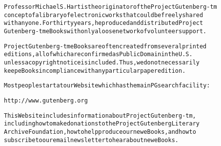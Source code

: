 \documentclass[12pt,oneside]{book}[2007/10/19]
\newenvironment{PGtext}{%
  \begin{alltt}
  \fontsize{9}{10}\ttfamily\selectfont}%
  {\end{alltt}%
}
\begin{document}
\begin{PGtext}
Professor Michael S. Hart is the originator of the Project Gutenberg-tm
concept of a library of electronic works that could be freely shared
with anyone.  For thirty years, he produced and distributed Project
Gutenberg-tm eBooks with only a loose network of volunteer support.


Project Gutenberg-tm eBooks are often created from several printed
editions, all of which are confirmed as Public Domain in the U.S.
unless a copyright notice is included.  Thus, we do not necessarily
keep eBooks in compliance with any particular paper edition.


Most people start at our Web site which has the main PG search facility:

     http://www.gutenberg.org

This Web site includes information about Project Gutenberg-tm,
including how to make donations to the Project Gutenberg Literary
Archive Foundation, how to help produce our new eBooks, and how to
subscribe to our email newsletter to hear about new eBooks.
\end{PGtext}

\end{document}
